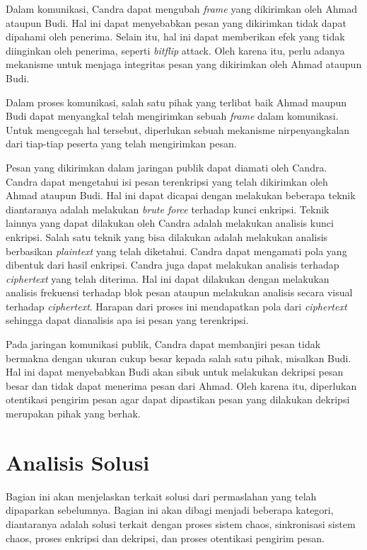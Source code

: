 Dalam komunikasi, Candra dapat mengubah \emph{frame} yang dikirimkan oleh Ahmad ataupun Budi. Hal ini dapat menyebabkan pesan yang dikirimkan tidak dapat dipahami oleh penerima. Selain itu, hal ini dapat memberikan efek yang tidak diinginkan oleh penerima, seperti \emph{bitflip} attack. Oleh karena itu, perlu adanya mekanisme untuk menjaga integritas pesan yang dikirimkan oleh Ahmad ataupun Budi.

Dalam proses komunikasi, salah satu pihak yang terlibat baik Ahmad maupun Budi dapat menyangkal telah mengirimkan sebuah \emph{frame} dalam komunikasi. Untuk mengcegah hal tersebut, diperlukan sebuah mekanisme nirpenyangkalan dari tiap-tiap peserta yang telah mengirimkan pesan.

Pesan yang dikirimkan dalam jaringan publik dapat diamati oleh Candra. Candra dapat mengetahui isi pesan terenkripsi yang telah dikirimkan oleh Ahmad ataupun Budi. Hal ini dapat dicapai dengan melakukan beberapa teknik diantaranya adalah melakukan \emph{brute force} terhadap kunci enkripsi. Teknik lainnya yang dapat dilakukan oleh Candra adalah melakukan analisis kunci enkripsi. Salah satu teknik yang bisa dilakukan adalah melakukan analisis berbasikan \emph{plaintext} yang telah diketahui. Candra dapat mengamati pola yang dibentuk dari hasil enkripsi. Candra juga dapat melakukan analisis terhadap \emph{ciphertext} yang telah diterima. Hal ini dapat dilakukan dengan melakukan analisis frekuensi terhadap blok pesan ataupun melakukan analisis secara visual terhadap \emph{ciphertext}. Harapan dari proses ini mendapatkan pola dari \emph{ciphertext} sehingga dapat dianalisis apa isi pesan yang terenkripsi.

Pada jaringan komunikasi publik, Candra dapat membanjiri pesan tidak bermakna dengan ukuran cukup besar kepada salah satu pihak, misalkan Budi. Hal ini dapat menyebabkan Budi akan sibuk untuk melakukan dekripsi pesan besar dan tidak dapat menerima pesan dari Ahmad. Oleh karena itu, diperlukan otentikasi pengirim pesan agar dapat dipastikan pesan yang dilakukan dekripsi merupakan pihak yang berhak.

\section{Analisis Solusi}

Bagian ini akan menjelaskan terkait solusi dari permaslahan yang telah dipaparkan sebelumnya. Bagian ini akan dibagi menjadi beberapa kategori, diantaranya adalah solusi terkait dengan proses sistem chaos, sinkronisasi sistem chaos, proses enkripsi dan dekripsi, dan proses otentikasi pengirim pesan.

